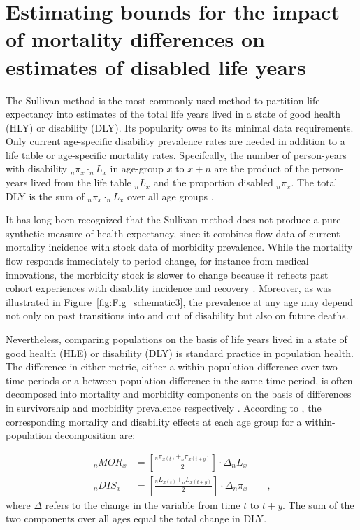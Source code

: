 \documentclass[11pt,oneside,a4paper]{article} %
\newcommand{\tc}{\quad\quad\text{,}}
\begin{document}
\FloatBarrier
\section{Estimating bounds for the impact of mortality differences on estimates of disabled life years}

The Sullivan method is the most commonly used method to partition life
expectancy into estimates of the total life years lived in a state of good
health (HLY) or disability (DLY). Its popularity owes to its minimal data
requirements. Only current age-specific disability prevalence rates are needed
in addition to a life table or age-specific mortality rates. Specifcally, the
number of person-years with disability $_{n}\pi _{x} \cdot _{n}L _{x}$ in
age-group $x$ to $x+n$ are the product of the person-years lived from the life
table $_{n}L _{x}$ and the proportion disabled $_{n}\pi _{x}$. The total DLY is
the sum of  $_{n}\pi _{x} \cdot _{n}L _{x}$ over all age groups
\citep{Sullivan1970}.

It has long been recognized that the Sullivan method does not produce a pure
synthetic measure of health expectancy, since it combines flow data of current
mortality incidence with stock data of morbidity prevalence. While the mortality
flow responds immediately to period change, for instance from medical
innovations, the morbidity stock is slower to change because it reflects past
cohort experiences with disability incidence and recovery
\citep{Mathers1997,Barendregt1994}. Moreover, as was illustrated in
Figure~\ref{fig:Fig_schematic3}, the prevalence at any age may depend not only
on past transitions into and out of disability but also on future deaths.

Nevertheless, comparing populations on the basis of life years lived in a state
of good health (HLE) or disability (DLY) is standard practice in population
health. The difference in either metric, either a within-population difference
over two time periods or a between-population difference in the same time
period, is often decomposed into mortality and morbidity components on the basis
of differences in survivorship and morbidity prevalence respectively
\citep{Nusselder2004,Andreev2002}. According to \citet{Nusselder2004}, the corresponding mortality and disability effects at each age group for a within-population decomposition are:

\begin{align}\label{eq:MORcomp}
\label{eq:nuss}
	{_{n}{MOR}_{x}}&=\left [ \frac{_{n}\pi_{x\left ( t \right )} + _{n}\pi_{x\left
	( t+y \right )}  }{2}\right ]\cdot \Delta _{n}L_{x} \label{eq:DIScomp} \\
	{_{n}{DIS}_{x}}&=\left [ \frac{_{n}L_{x\left ( t \right )} + _{n}L_{x\left (
	t+y \right )}  }{2}\right ]\cdot \Delta _{n}\pi_{x}	\tc
\end{align}
where $\Delta$ refers to the change in the variable from time $t$ to $t+y$. The sum of the two components over all ages equal the total change in DLY.
\end{document}
